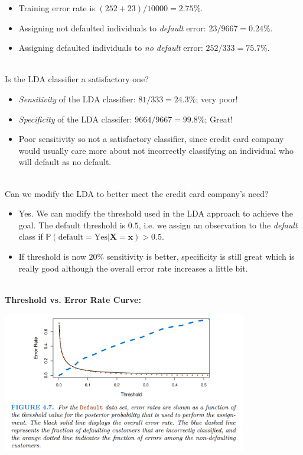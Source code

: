 \documentclass[11pt]{article}
\begin{document}
\begin{itemize}
    \item Training error rate is $(252+23)/10000 = 2.75\%$.
    \item Assigning not defaulted individuals to \textit{default} error: $23/9667 = 0.24\%$.
    \item Assigning defaulted individuals to \textit{no default} error: $252/333 = 75.7\%$.
\end{itemize}
\phantom{i} \\
\noindent Is the LDA classifier a satisfactory one?
\begin{itemize}
    \item \textit{Sensitivity} of the LDA classifier: $81/333 = 24.3\%$; very poor!
    \item \textit{Specificity} of the LDA classifer: $9664/9667 = 99.8\%$; Great!
    \item Poor sensitivity so not a satisfactory classifier, since credit card company would usually care more about not incorrectly classifying an individual who will default as no default.
\end{itemize}
\phantom{i} \\
\noindent Can we modify the LDA to better meet the credit card company's need?
\begin{itemize}
    \item Yes. We can modify the threshold used in the LDA approach to achieve the goal. The default threshold is $0.5$, i.e. we assign an observation to the \textit{default} class if $\mathbb{P}(\text{default} = \text{Yes}|\boldsymbol{X} = \boldsymbol{x}) > 0.5$.
    \item If threshold is now $20\%$ sensitivity is better, specificity is still great which is really good although the overall error rate increases a little bit.
\end{itemize}
\phantom{i} \\
\noindent \textbf{Threshold vs. Error Rate Curve:}
\begin{center}
  \includegraphics[width=0.8\textwidth]{LDA Example Threshold vs Error Rate.png}
\end{center}
\end{document}

